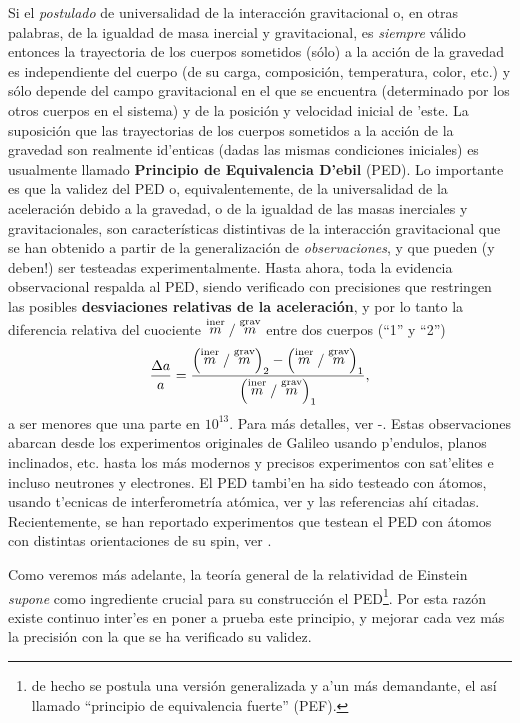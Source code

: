 Si el \textit{postulado} de universalidad de la interacción gravitacional o, en otras palabras, de la igualdad de masa inercial y gravitacional, es \textit{siempre} válido entonces la trayectoria de los cuerpos sometidos (sólo) a la acción de la gravedad es independiente del cuerpo (de su carga, composición, temperatura, color, etc.) y sólo depende del campo gravitacional en el que se encuentra (determinado por los otros cuerpos en el sistema) y de la posición y velocidad inicial de 'este. La suposición que las trayectorias de los cuerpos sometidos a la acción de la gravedad son realmente id'enticas (dadas las mismas condiciones iniciales) es usualmente llamado \textbf{Principio de Equivalencia D'ebil} (PED). Lo importante es que la validez del PED o, equivalentemente, de la universalidad de la aceleración debido a la gravedad, o de la igualdad de las masas inerciales y gravitacionales, son características distintivas de la interacción gravitacional que se han obtenido a partir de la generalización de \textit{observaciones}, y que pueden (y deben!) ser testeadas experimentalmente. Hasta ahora, toda la evidencia observacional respalda al PED, siendo verificado con precisiones que restringen las posibles \textbf{desviaciones relativas de la aceleración}, y por lo tanto la diferencia relativa del cuociente $\stackrel{\rm iner}{m}/\stackrel{\rm grav}{m}$ entre dos cuerpos (``1'' y ``2'')
\begin{equation}
\frac{\Delta a}{a}=\frac{\left(\stackrel{\rm iner}{m}/\stackrel{\rm grav}{m}\right)_2-\left(\stackrel{\rm iner}{m}/\stackrel{\rm grav}{m}\right)_1}{\left(\stackrel{\rm iner}{m}/\stackrel{\rm grav}{m}\right)_1},
\end{equation}
a ser menores que una parte en $10^{13}$. Para más detalles, ver \cite{Will06}-\cite{STEP}.
Estas observaciones abarcan desde los experimentos originales de Galileo usando p'endulos, planos inclinados, etc. hasta los más modernos y precisos experimentos con sat'elites e incluso neutrones \cite{Koester76} y electrones. El PED tambi'en ha sido testeado con átomos, usando t'ecnicas de interferometría atómica, ver \cite{Zhou15} y las referencias ahí citadas. Recientemente, se han reportado experimentos que testean el PED con átomos con distintas orientaciones de su spin, ver \cite{Duan16}.

Como veremos más adelante, la teoría general de la relatividad de Einstein \textit{supone} como ingrediente crucial para su construcción el PED\footnote{de hecho se postula una versión generalizada y a'un más demandante, el así llamado ``principio de equivalencia fuerte'' (PEF).}. Por esta razón existe continuo inter'es en poner a prueba este principio, y mejorar cada vez más la precisión con la que se ha verificado su validez.

